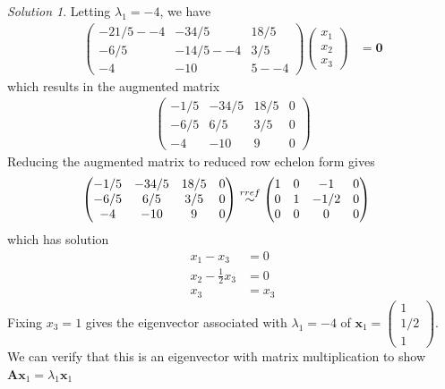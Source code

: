 \documentclass[
]{book}
\theoremstyle{definition}
\theoremstyle{definition}
\theoremstyle{definition}
\theoremstyle{definition}
\theoremstyle{remark}
\newtheorem*{solution}{Solution}
\begin{document}
\begin{solution}
Letting \(\lambda_1 = -4\), we have
\[
\begin{aligned}
\begin{pmatrix} 
-21/5  - -4 & -34/5 & 18/5 \\
-6/5 & -14/5 - -4 & 3/5 \\
-4 & -10 & 5 - -4
\end{pmatrix} \begin{pmatrix} x_1 \\ x_2 \\ x_3 \end{pmatrix} & = \mathbf{0}
\end{aligned}
\]
which results in the augmented matrix
\[
\begin{aligned}
\begin{pmatrix} -1/5 & -34/5 & 18/5 & 0 \\ -6/5 & 6/5 & 3/5 & 0 \\ -4 & -10 & 9 & 0 \end{pmatrix}
\end{aligned}
\]
Reducing the augmented matrix to reduced row echelon form gives
\[
\begin{aligned}
\begin{pmatrix} -1/5 & -34/5 & 18/5 & 0 \\ -6/5 & 6/5 & 3/5 & 0 \\ -4 & -10 & 9 & 0 \end{pmatrix} & \stackrel{rref}{\huge \sim} \begin{pmatrix} 1 & 0 & -1 & 0 \\ 0 & 1 & -1/2 & 0 \\ 0 & 0 & 0 & 0 \end{pmatrix}
\end{aligned}
\]
which has solution
\[
\begin{aligned}
x_1 - x_3 & = 0 \\
x_2 - \frac{1}{2} x_3 & = 0 \\
x_3 & = x_3
\end{aligned}
\]
Fixing \(x_3 = 1\) gives the eigenvector associated with \(\lambda_1 = -4\) of \(\mathbf{x}_1 = \begin{pmatrix} 1 \\ 1/2 \\ 1 \end{pmatrix}\). We can verify that this is an eigenvector with matrix multiplication to show \(\mathbf{A} \mathbf{x}_1 = \lambda_1 \mathbf{x}_1\)
\[
\begin{aligned}

\end{aligned}\]
\end{solution}
\end{document}
